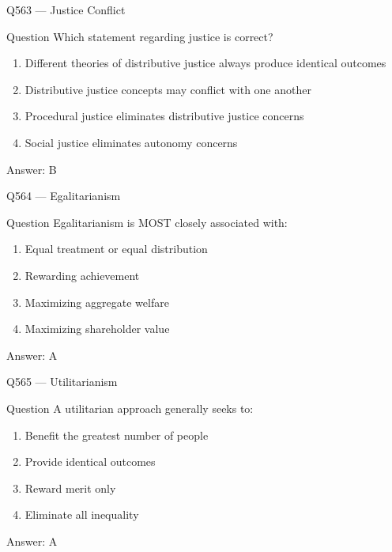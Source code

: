 \documentclass[aspectratio=169,8pt]{beamer}
\begin{document}
\begin{frame}{Q563 --- Justice Conflict}
	\begin{block}{Question}
		Which statement regarding justice is correct?
		\begin{enumerate}
			\item Different theories of distributive justice always produce identical outcomes
			\item Distributive justice concepts may conflict with one another
			\item Procedural justice eliminates distributive justice concerns
			\item Social justice eliminates autonomy concerns
		\end{enumerate}
	\end{block}
	
	\begin{exampleblock}{Answer: B}\end{exampleblock}
\end{frame}

\begin{frame}{Q564 --- Egalitarianism}
	\begin{block}{Question}
		Egalitarianism is MOST closely associated with:
		\begin{enumerate}
			\item Equal treatment or equal distribution
			\item Rewarding achievement
			\item Maximizing aggregate welfare
			\item Maximizing shareholder value
		\end{enumerate}
	\end{block}
	
	\begin{exampleblock}{Answer: A}\end{exampleblock}
\end{frame}

\begin{frame}{Q565 --- Utilitarianism}
	\begin{block}{Question}
		A utilitarian approach generally seeks to:
		\begin{enumerate}
			\item Benefit the greatest number of people
			\item Provide identical outcomes
			\item Reward merit only
			\item Eliminate all inequality
		\end{enumerate}
	\end{block}
	
	\begin{exampleblock}{Answer: A}\end{exampleblock}
\end{frame}
\end{document}
